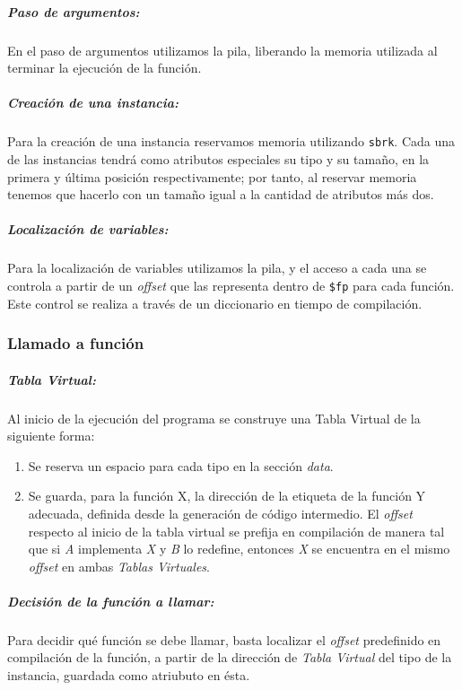 \documentclass[a4paper,10pt,twocolumn]{article}
\begin{document}
\subparagraph{Paso de argumentos:}
	 En el paso de argumentos utilizamos la pila, liberando la memoria utilizada al terminar la ejecución de la función. 
\subparagraph{Creación de una instancia:}
	Para la creación de una instancia reservamos memoria utilizando \lstinline|sbrk|. Cada una de las instancias tendrá como atributos especiales su tipo y su tamaño, en la primera y última posición respectivamente; por tanto, al reservar memoria tenemos que hacerlo con un tamaño igual a la cantidad de atributos más dos.

\subparagraph{Localización de variables:}
	Para la localización de variables utilizamos la pila, y el acceso a cada una se controla a partir de un \textit{offset} que las representa dentro de \lstinline|$fp| para cada función. Este control se realiza a través de un diccionario en tiempo de compilación. 
	
\subsubsection{Llamado a función}

\subparagraph{Tabla Virtual:}
Al inicio de la ejecución del programa se construye una Tabla Virtual de la siguiente forma:

\begin{enumerate}
	\item Se reserva un espacio para cada tipo en la sección \textit{data}. 
	\item Se guarda, para la función X, la dirección de la etiqueta de la función Y adecuada, definida desde la generación de código intermedio. El \textit{offset} respecto al inicio de la tabla virtual se prefija en compilación de manera tal que si \textit{A} implementa \textit{X} y \textit{B} lo redefine, entonces \textit{X} se encuentra en el mismo \textit{offset} en ambas \textit{Tablas Virtuales}.
\end{enumerate}

\subparagraph{Decisión de la función a llamar:}
Para decidir qué función se debe llamar, basta localizar el \textit{offset} predefinido en compilación de la función, a partir de la dirección de \textit{Tabla Virtual} del tipo de la instancia, guardada como atriubuto en ésta.
\end{document}
